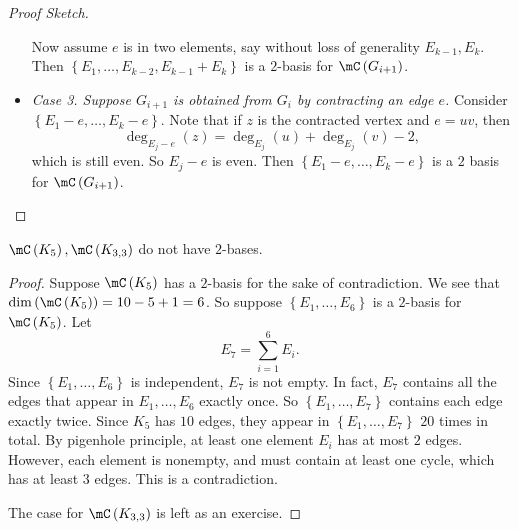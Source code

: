\documentclass[co342]{subfiles}
\begin{document}
\begin{proof}[Proof Sketch]
\begin{itemize}
                Now assume $e$ is in two elements, say without loss of generality $E_{k-1}, E_k$. Then $\left\lbrace E_1,\ldots,E_{k-2},E_{k-1}+E_k \right\rbrace$ is a $2$-basis for $\mC\left( G_{i+1} \right)$.

            \item \textit{Case 3. Suppose $G_{i+1}$ is obtained from $G_i$ by contracting an edge $e$.} Consider $\left\lbrace E_1-e,\ldots,E_k-e \right\rbrace$. Note that if $z$ is the contracted vertex and $e=uv$, then 
                \begin{equation*}
                    \deg_{E_j-e}\left( z \right) = \deg_{E_j}\left( u \right)+\deg_{E_j}\left( v \right)-2,
                \end{equation*}
                which is still even. So $E_j-e$ is even. Then $\left\lbrace E_1-e,\ldots,E_k-e \right\rbrace$ is a $2$ basis for $\mC\left( G_{i+1} \right)$. \qqedsym
        \end{itemize} 
    \end{proof}
    
    \clearpage
    \begin{prop}{}
        $\mC\left( K_5 \right),\mC\left( K_{3,3} \right)$ do not have $2$-bases. 
    \end{prop}

    \begin{proof}
        Suppose $\mC\left( K_5 \right)$ has a $2$-basis for the sake of contradiction. We see that $\dim\left( \mC\left( K_5 \right) \right)=10-5+1=6$. So suppose $\left\lbrace E_1,\ldots,E_6 \right\rbrace$ is a $2$-basis for $\mC\left( K_5 \right)$. Let
        \begin{equation*}
            E_7 = \sum^{6}_{i=1}E_i.
        \end{equation*}
        Since $\left\lbrace E_1,\ldots,E_6 \right\rbrace$ is independent, $E_7$ is not empty. In fact, $E_7$ contains all the edges that appear in $E_1,\ldots,E_6$ exactly once. So $\left\lbrace E_1,\ldots,E_7 \right\rbrace$ contains each edge exactly twice. Since $K_5$ has $10$ edges, they appear in $\left\lbrace E_1,\ldots,E_7 \right\rbrace$ $20$ times in total. By pigenhole principle, at least one element $E_i$ has at most $2$ edges. However, each element is nonempty, and must contain at least one cycle, which has at least $3$ edges. This is a contradiction.

        The case for $\mC\left( K_{3,3} \right)$ is left as an exercise.
    \end{proof}
\end{document}
